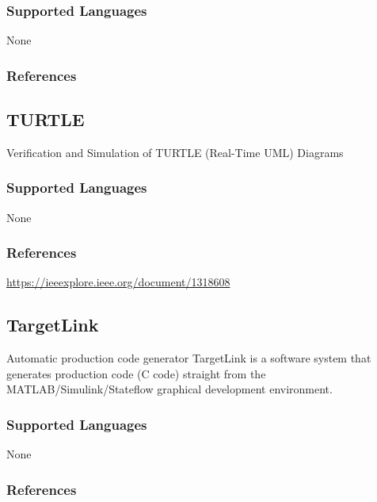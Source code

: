 \subsubsection{Supported Languages}

None


\subsubsection{References}





\subsection{TURTLE}
\label{subsecT:TURTLE}

Verification and Simulation of TURTLE (Real-Time UML) Diagrams

\subsubsection{Supported Languages}

None


\subsubsection{References}

\url{https://ieeexplore.ieee.org/document/1318608}



\subsection{TargetLink}
\label{subsecT:TargetLink}



Automatic production code generator
TargetLink is a software system that generates production code (C code) straight from the MATLAB/Simulink/Stateflow graphical development environment.

\subsubsection{Supported Languages}

None


\subsubsection{References}






